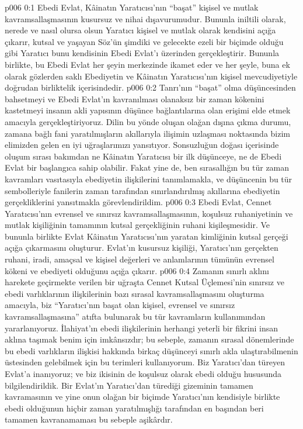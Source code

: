 \vs p006 0:1 Ebedi Evlat, Kâinatın Yaratıcısı’nın “başat” kişisel ve mutlak kavramsallaşmasının kusursuz ve nihai dışavurumudur. Bununla iniltili olarak, nerede ve nasıl olursa olsun Yaratıcı kişisel ve mutlak olarak kendisini açığa çıkarır, kutsal ve yaşayan Söz’ün şimdiki ve gelecekte ezeli bir biçimde olduğu gibi Yaratıcı bunu kendisinin Ebedi Evlat’ı üzerinden gerçekleştirir. Bununla birlikte, bu Ebedi Evlat her şeyin merkezinde ikamet eder ve her şeyle, buna ek olarak gözlerden saklı Ebediyetin ve Kâinatın Yaratıcısı’nın kişisel mevcudiyetiyle doğrudan birliktelik içerisindedir.
\vs p006 0:2 Tanrı’nın “başat” olma düşüncesinden bahsetmeyi ve Ebedi Evlat’ın kavranılması olanaksız bir zaman kökenini kastetmeyi insanın akli yapısının düşünce bağlantılarına olan erişimi elde etmek amacıyla gerçekleştiriyoruz. Dilin bu yönde oluşan olağan dışına çıkma durumu, zamana bağlı fani yaratılmışların akıllarıyla ilişimin uzlaşması noktasında bizim elimizden gelen en iyi uğraşlarımızı yansıtıyor. Sonsuzluğun doğası içerisinde oluşum sırası bakımdan ne Kâinatın Yaratıcısı bir ilk düşünceye, ne de Ebedi Evlat bir başlangıca sahip olabilir. Fakat yine de, ben sırasallığın bu tür zaman kavramları vasıtasıyla ebediyetin ilişkilerini tanımlamakla, ve düşüncenin bu tür sembolleriyle fanilerin zaman tarafından sınırlandırılmış akıllarına ebediyetin gerçekliklerini yansıtmakla görevlendirildim.
\vs p006 0:3 Ebedi Evlat, Cennet Yaratıcısı’nın evrensel ve sınırsız kavramsallaşmasının, koşulsuz ruhaniyetinin ve mutlak kişiliğinin tamamının kutsal gerçekliğinin ruhani kişileşmesidir. Ve bununla birlikte Evlat Kâinatın Yaratıcısı’nın yaratan kimliğinin kutsal gerçeği açığa çıkarmasını oluşturur. Evlat’ın kusursuz kişiliği, Yaratıcı’nın gerçekten ruhani, iradi, amaçsal ve kişisel değerleri ve anlamlarının tümünün evrensel kökeni ve ebediyeti olduğunu açığa çıkarır.
\vs p006 0:4 Zamanın sınırlı aklını harekete geçirmekte verilen bir uğraşta Cennet Kutsal Üçlemesi’nin sınırsız ve ebedi varlıklarının ilişkilerinin bazı sırasal kavramsallaşmasını oluşturma amacıyla, biz “Yaratıcı’nın başat olan kişisel, evrensel ve sınırsız kavramsallaşmasına” atıfta bulunarak bu tür kavramların kullanımından yararlanıyoruz. İlahiyat’ın ebedi ilişkilerinin herhangi yeterli bir fikrini insan aklına taşımak benim için imkânsızdır; bu sebeple, zamanın sırasal dönemlerinde bu ebedi varlıkların ilişkisi hakkında birkaç düşünceyi sınırlı akla ulaştırabilmenin üstesinden gelebilmek için bu terimleri kullanıyorum. Biz Yaratıcı’dan türeyen Evlat’a inanıyoruz; ve biz ikisinin de koşulsuz olarak ebedi olduğu hususunda bilgilendirildik. Bir Evlat’ın Yaratıcı’dan türediği gizeminin tamamen kavramasının ve yine onun olağan bir biçimde Yaratıcı’nın kendisiyle birlikte ebedi olduğunun hiçbir zaman yaratılmışlığı tarafından en başından beri tamamen kavranamaması bu sebeple aşikârdır.
